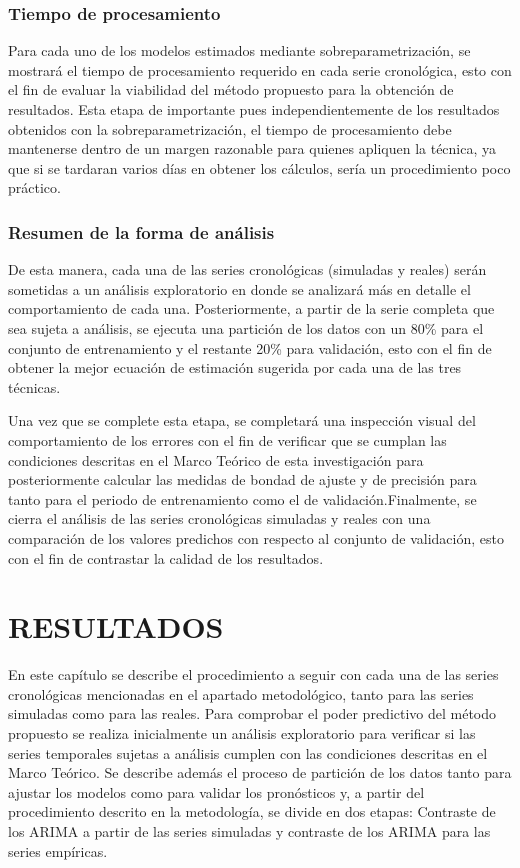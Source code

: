 \documentclass[
]{article}
\begin{document}
\subsubsection{Tiempo de procesamiento}

Para cada uno de los modelos estimados mediante sobreparametrización, se
mostrará el tiempo de procesamiento requerido en cada serie cronológica,
esto con el fin de evaluar la viabilidad del método propuesto para la
obtención de resultados. Esta etapa de importante pues
independientemente de los resultados obtenidos con la
sobreparametrización, el tiempo de procesamiento debe mantenerse dentro
de un margen razonable para quienes apliquen la técnica, ya que si se
tardaran varios días en obtener los cálculos, sería un procedimiento
poco práctico.

\subsubsection{Resumen de la forma de análisis}

De esta manera, cada una de las series cronológicas (simuladas y reales)
serán sometidas a un análisis exploratorio en donde se analizará más en
detalle el comportamiento de cada una. Posteriormente, a partir de la
serie completa que sea sujeta a análisis, se ejecuta una partición de
los datos con un 80\% para el conjunto de entrenamiento y el restante
20\% para validación, esto con el fin de obtener la mejor ecuación de
estimación sugerida por cada una de las tres técnicas.

Una vez que se complete esta etapa, se completará una inspección visual
del comportamiento de los errores con el fin de verificar que se cumplan
las condiciones descritas en el Marco Teórico de esta investigación para
posteriormente calcular las medidas de bondad de ajuste y de precisión
para tanto para el periodo de entrenamiento como el de
validación.Finalmente, se cierra el análisis de las series cronológicas
simuladas y reales con una comparación de los valores predichos con
respecto al conjunto de validación, esto con el fin de contrastar la
calidad de los resultados.

\newpage

\section{RESULTADOS}

En este capítulo se describe el procedimiento a seguir con cada una de
las series cronológicas mencionadas en el apartado metodológico, tanto
para las series simuladas como para las reales. Para comprobar el poder
predictivo del método propuesto se realiza inicialmente un análisis
exploratorio para verificar si las series temporales sujetas a análisis
cumplen con las condiciones descritas en el Marco Teórico. Se describe
además el proceso de partición de los datos tanto para ajustar los
modelos como para validar los pronósticos y, a partir del procedimiento
descrito en la metodología, se divide en dos etapas: Contraste de los
ARIMA a partir de las series simuladas y contraste de los ARIMA para las
series empíricas.
\end{document}
